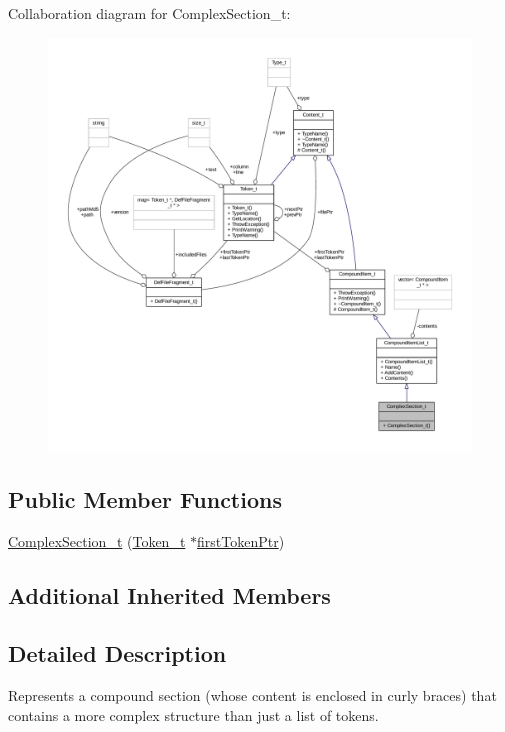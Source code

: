 Collaboration diagram for Complex\+Section\+\_\+t\+:
\nopagebreak
\begin{figure}[H]
\begin{center}
\leavevmode
\includegraphics[width=350pt]{struct_complex_section__t__coll__graph}
\end{center}
\end{figure}
\subsection*{Public Member Functions}
\begin{DoxyCompactItemize}
\item 
\hyperlink{struct_complex_section__t_a15c326c3fd8c9318e90066afd3e1624a}{Complex\+Section\+\_\+t} (\hyperlink{struct_token__t}{Token\+\_\+t} $\ast$\hyperlink{struct_compound_item__t_a4d95dc788120f627e332491589d20c5c}{first\+Token\+Ptr})
\end{DoxyCompactItemize}
\subsection*{Additional Inherited Members}


\subsection{Detailed Description}
Represents a compound section (whose content is enclosed in curly braces) that contains a more complex structure than just a list of tokens. 

